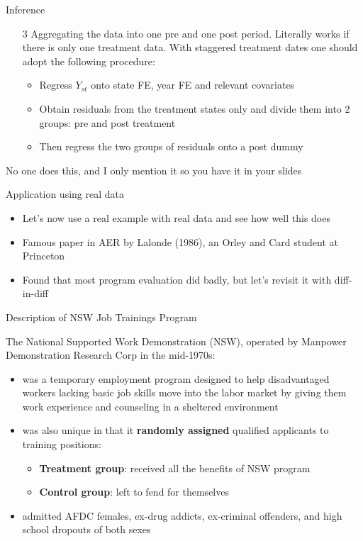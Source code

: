 \documentclass{beamer}
\begin{document}
\begin{frame}{Inference}

\begin{enumerate}
		\item[3] Aggregating the data into one pre and one post period. Literally works if there is only one treatment data.  With staggered treatment dates one should adopt the following procedure:
			\begin{itemize}
			\item Regress $Y_{st}$ onto state FE, year FE and relevant covariates
			\item Obtain residuals from the treatment states only and divide them into 2 groups: pre and post treatment
			\item Then regress the two groups of residuals onto a post dummy
			\end{itemize}
\end{enumerate}

No one does this, and I only mention it so you have it in your slides

\end{frame}

\begin{frame}{Application using real data}

\begin{itemize}
\item Let's now use a real example with real data and see how well this does
\item Famous paper in AER by Lalonde (1986), an Orley and Card student at Princeton
\item Found that most program evaluation did badly, but let's revisit it with diff-in-diff
\end{itemize}

\end{frame}

\begin{frame}{Description of NSW Job Trainings Program}
	
The National Supported Work Demonstration (NSW), operated by Manpower Demonstration Research Corp in the mid-1970s:
	\begin{itemize}
	\item was a temporary employment program designed to help disadvantaged workers lacking basic job skills move into the labor market by giving them work experience and counseling in a sheltered environment
	\item was also unique in that it \textbf{randomly assigned} qualified applicants to training positions:
		\begin{itemize}
		\item \textbf{Treatment group}: received all the benefits of NSW program
		\item \textbf{Control group}: left to fend for themselves
		\end{itemize}
	\item admitted AFDC females, ex-drug addicts, ex-criminal offenders, and high school dropouts of both sexes
	\end{itemize}
\end{frame}
\end{document}
